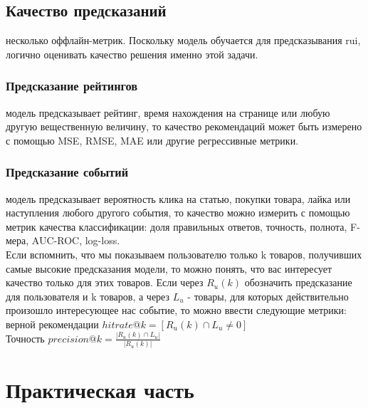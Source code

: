 \documentclass{article}
\newcommand\tab[1][1cm]{\hspace*{#1}}
\begin{document}
\subsection*{Качество предсказаний}
 несколько оффлайн-метрик. Поскольку модель обучается для предсказывания rui, логично оценивать качество решения именно этой задачи.\\
\subsubsection*{Предсказание рейтингов}
 модель предсказывает рейтинг, время нахождения на странице или любую другую вещественную величину, то качество рекомендаций может быть измерено с помощью ﻿MSE﻿, ﻿RMSE, ﻿MAE﻿ или другие регрессивные метрики.\\
\subsubsection*{Предсказание событий}
 модель предсказывает вероятность клика на статью, покупки товара, лайка или наступления любого другого события, то качество можно измерить с помощью метрик качества классификации: доля правильных ответов, точность, полнота, F-мера, AUC-ROC, log-loss.\\
Если вспомнить, что мы показываем пользователю только ﻿k﻿ товаров, получивших самые высокие предсказания модели, то можно понять, что вас интересует качество только для этих товаров. Если через ﻿$R_u(k)$ обозначить предсказание для пользователя и ﻿k товаров, а через $L_u$ - товары, для которых действительно произошло интересующее нас событие, то можно ввести следующие метрики:\\
 верной рекомендации $hitrate@k=[R_u(k)\cap L_u \neq 0]$\\
Точность $precision@k=\frac{|R_u(k)\cap L_u|}{|R_u(k)|}$





















\newpage
\section{Практическая часть}
\end{document}
